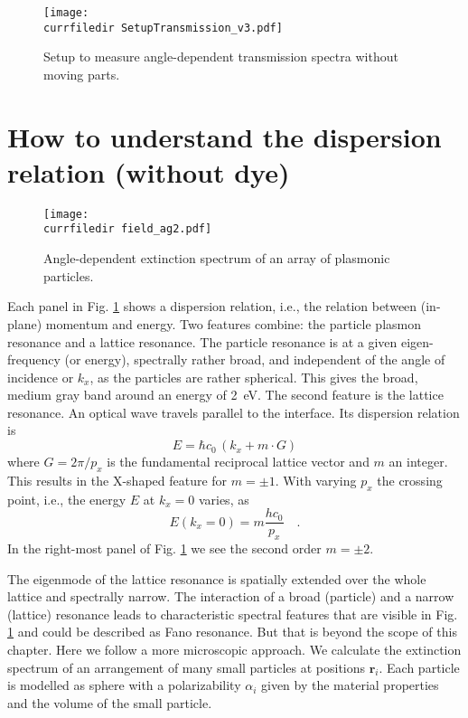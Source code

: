 \begin{figure}
\texttt{[image: \\currfiledir SetupTransmission\_v3.pdf]}
\caption{Setup to measure angle-dependent transmission spectra without moving parts. }
\end{figure}


\section{How to understand the dispersion relation (without dye)}

\begin{figure}
  \texttt{[image: \\currfiledir field\_ag2.pdf]}
  \caption{Angle-dependent extinction spectrum of an array of plasmonic particles. \label{fig:8_without_dye} }
  \end{figure}
  

  

Each panel in Fig. \ref{fig:8_without_dye} shows a dispersion relation, i.e., the relation between (in-plane) momentum and energy. Two features combine: the particle plasmon resonance and a lattice resonance. The particle resonance is at a given eigen-frequency (or energy), spectrally rather broad, and independent of the angle of incidence or $k_x$, as the particles are rather spherical. This gives the broad, medium gray band around an energy of 2~eV. The second feature is the lattice resonance.  An optical wave travels parallel to the interface. Its dispersion relation is
\begin{equation}
 E =   \hbar c_0  \, \left(  k_x + m \cdot G \right)
\end{equation}
where $G = 2 \pi / p_x$ is the fundamental reciprocal lattice vector and $m$ an integer. This results in the X-shaped feature for $m = \pm 1$. With varying $p_x$ the crossing point, i.e., the energy $E$ at $k_x = 0$ varies, as
\begin{equation}
  E(k_x = 0) = m \frac{h c_0}{p_x} \quad .
\end{equation}
In the right-most panel of  Fig. \ref{fig:8_without_dye} we see the second order $m= \pm 2 $.

The eigenmode of the lattice resonance is spatially extended over the whole lattice and spectrally narrow. The interaction of a broad (particle)  and a narrow (lattice) resonance leads to characteristic spectral features that are visible in Fig. \ref{fig:8_without_dye}  and could be described as Fano resonance. But that is beyond the scope of this chapter. Here we follow a more microscopic approach. We calculate the extinction spectrum of an  arrangement of  many small particles at positions $\mathbf{r}_i$.
Each  particle is modelled as sphere  with a  polarizability $\alpha_i$ given by the material properties and the volume of the small particle. 

